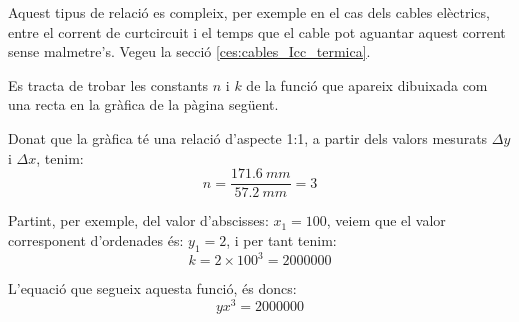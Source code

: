 Aquest tipus de relació es compleix, per exemple en el cas dels cables elèctrics, entre el corrent de curtcircuit i el temps que el cable pot aguantar aquest corrent sense malmetre's. Vegeu la secció \vref{ces:cables_Icc_termica}.


\begin{exemple}
    Es tracta de trobar les constants $n$ i $k$ de la funció que apareix dibuixada com una recta en la gràfica de la pàgina següent.

     Donat que la gràfica té una relació d'aspecte 1:1, a partir dels valors mesurats $\Delta{}y$ i $\Delta{}x$, tenim:
    \[
        n = \frac{\SI{171,6}{mm}}{\SI{57,2}{mm}} = 3
    \]

    Partint, per exemple, del valor d'abscisses: $x_1=100$, veiem que el valor corresponent d'ordenades és: $y_1=2$, i per tant tenim:
    \[
        k = 2 \times 100^3  = \num{2000000}
    \]

    L'equació que segueix aquesta funció, és doncs:
    \[
        y x^3 = \num{2000000}
    \]

   \begin{center}
        
   \end{center}

\end{exemple}

